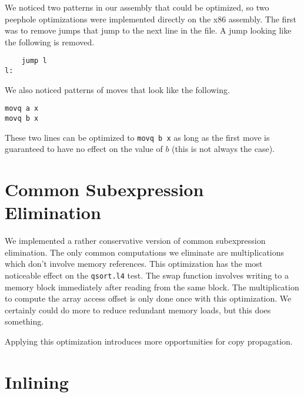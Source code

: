 \documentclass[aps,letterpaper,11pt]{revtex4}
\begin{document}
We noticed two patterns in our assembly that could be optimized, so two peephole optimizations were implemented
directly on the x86 assembly. The first was to remove jumps that jump to the next line in the file. A jump
looking like the following is removed.

\begin{verbatim}
    jump l
l:
\end{verbatim}

We also noticed patterns of moves that look like the following.

\begin{verbatim}
movq a x
movq b x
\end{verbatim}

These two lines can be optimized to \texttt{movq b x} as long as the first move is guaranteed to have no effect
on the value of $b$ (this is not always the case).

\section{Common Subexpression Elimination}
We implemented a rather conservative version of common subexpression elimination. The only common computations
we eliminate are multiplications which don't involve memory references. This optimization has the most noticeable
effect on the \texttt{qsort.l4} test. The swap function involves writing to a memory block immediately after
reading from the same block. The multiplication to compute the array access offset is only done once with this
optimization. We certainly could do more to reduce redundant memory loads, but this does something.

Applying this optimization introduces more opportunities for copy propagation.

\section{Inlining}
\end{document}
